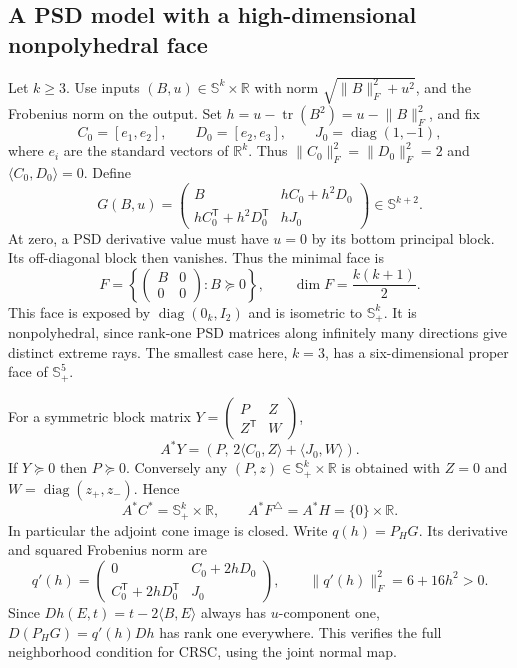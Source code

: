 \documentclass[11pt]{article}
\numberwithin{equation}{section}
\theoremstyle{definition}
\theoremstyle{remark}
\DeclareMathOperator{\tr}{tr}
\DeclareMathOperator{\diag}{diag}
\newcommand{\R}{\mathbb R}
\newcommand{\Ssym}{\mathbb S}
\newcommand{\ip}[2]{\langle #1,#2\rangle}
\newcommand{\norm}[1]{\lVert #1\rVert}
\begin{document}
\subsection{A PSD model with a high-dimensional nonpolyhedral face}

Let $k\geq3$. Use inputs $(B,u)\in\Ssym^k\times\R$ with norm
$\sqrt{\norm{B}_F^2+u^2}$, and the Frobenius norm on the output.
Set $h=u-\tr(B^2)=u-\norm{B}_F^2$, and fix
\[
 C_0=[e_1,e_2],\qquad D_0=[e_2,e_3],\qquad
 J_0=\diag(1,-1),
\]
where $e_i$ are the standard vectors of $\R^k$.
Thus $\norm{C_0}_F^2=\norm{D_0}_F^2=2$ and
$\ip{C_0}{D_0}=0$. Define
\begin{equation}
 G(B,u)=
 \begin{pmatrix}
 B & hC_0+h^2D_0\\
 hC_0^{\mathsf T}+h^2D_0^{\mathsf T} & hJ_0
 \end{pmatrix}\in\Ssym^{k+2}.
 \label{eq:psd-example}
\end{equation}
At zero, a PSD derivative value must have $u=0$ by its bottom principal
block. Its off-diagonal block then vanishes. Thus the minimal face is
\begin{equation}
 F=\left\{\begin{pmatrix}B&0\\0&0\end{pmatrix}:B\succeq0\right\},
 \qquad \dim F=\frac{k(k+1)}{2}.
 \label{eq:psd-minimal}
\end{equation}
This face is exposed by $\diag(0_k,I_2)$ and is isometric to
$\Ssym_+^k$. It is nonpolyhedral, since rank-one PSD matrices along
infinitely many directions give distinct extreme rays. The smallest
case here, $k=3$, has a six-dimensional proper face of $\Ssym_+^5$.

For a symmetric block matrix $Y=\left(\begin{smallmatrix}P&Z\\
Z^{\mathsf T}&W\end{smallmatrix}\right)$,
\[
 A^*Y=(P,\,2\ip{C_0}{Z}+\ip{J_0}{W}).
\]
If $Y\succeq0$ then $P\succeq0$. Conversely any
$(P,z)\in\Ssym_+^k\times\R$ is obtained with $Z=0$ and
$W=\diag(z_+,z_-)$. Hence
\begin{equation}
 A^*C^*=\Ssym_+^k\times\R,
 \qquad A^*F^\triangle=A^*H=\{0\}\times\R.
 \label{eq:psd-adjoint}
\end{equation}
In particular the adjoint cone image is closed.
Write $q(h)=P_HG$. Its derivative and squared Frobenius norm are
\[
 q'(h)=\begin{pmatrix}0&C_0+2hD_0\\
 C_0^{\mathsf T}+2hD_0^{\mathsf T}&J_0\end{pmatrix},
 \qquad\norm{q'(h)}_F^2=6+16h^2>0.
\]
Since $Dh(E,t)=t-2\ip{B}{E}$ always has $u$-component one,
$D(P_HG)=q'(h)Dh$ has rank one everywhere. This verifies the full
neighborhood condition for CRSC, using the joint normal map.
\end{document}
